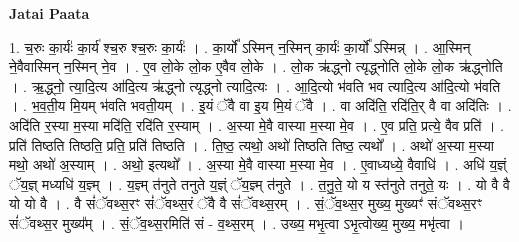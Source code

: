 \documentclass[17pt]{extarticle}
\begin{document}
\textbf{Jatai Paata} \newline

1. च॒रुः का॒र्यः॑ का॒र्य॑ श्च॒रु श्च॒रुः का॒र्यः॑ । . का॒र्यो᳚ ऽस्मिन् न॒स्मिन् का॒र्यः॑ का॒र्यो᳚ ऽस्मिन्न् । . आ॒स्मिन् ने॒वैवास्मिन् न॒स्मिन् ने॒व । . ए॒व लो॒के लो॒क ए॒वैव लो॒के । . लो॒क ऋ॑द्ध्नो त्यृद्ध्नोति लो॒के लो॒क ऋ॑द्ध्नोति । . ऋ॒द्ध्नो॒ त्या॒दि॒त्य आ॑दि॒त्य ऋ॑द्ध्नो त्यृद्ध्नो त्यादि॒त्यः । . आ॒दि॒त्यो भ॑वति भव त्यादि॒त्य आ॑दि॒त्यो भ॑वति । . भ॒व॒ती॒य मि॒यम् भ॑वति भवती॒यम् । . इ॒यं ॅवै वा इ॒य मि॒यं ॅवै । . वा अदि॑ति॒ रदि॑ति॒र् वै वा अदि॑तिः । . अदि॑ति र॒स्या म॒स्या मदि॑ति॒ रदि॑ति र॒स्याम् । . अ॒स्या मे॒वै वास्या म॒स्या मे॒व । . ए॒व प्रति॒ प्रत्ये॒ वैव प्रति॑ । . प्रति॑ तिष्ठति तिष्ठति॒ प्रति॒ प्रति॑ तिष्ठति । . ति॒ष्ठ॒ त्यथो॒ अथो॑ तिष्ठति तिष्ठ॒ त्यथो᳚ । . अथो॑ अ॒स्या म॒स्या मथो॒ अथो॑ अ॒स्याम् । . अथो॒ इत्यथो᳚ । . अ॒स्या मे॒वै वास्या म॒स्या मे॒व । . ए॒वाध्यध्ये॒ वैवाधि॑ । . अधि॑ य॒ज्ञ्ं ॅय॒ज्ञ् मध्यधि॑ य॒ज्ञ्म् । . य॒ज्ञ्म् त॑नुते तनुते य॒ज्ञ्ं ॅय॒ज्ञ्म् त॑नुते । . त॒नु॒ते॒ यो य स्त॑नुते तनुते॒ यः । . यो वै वै यो यो वै । . वै सं॑ॅवथ्स॒रꣳ सं॑ॅवथ्स॒रं ॅवै वै सं॑ॅवथ्स॒रम् । . सं॒ॅव॒थ्स॒र मुख्य॒ मुख्यꣳ॑ संॅवथ्स॒रꣳ सं॑ॅवथ्स॒र मुख्य᳚म् । . सं॒ॅव॒थ्स॒रमिति॑ सं - व॒थ्स॒रम् । . उख्य॒ मभृ॒त्वा ऽभृ॒त्वोख्य॒ मुख्य॒ मभृ॑त्वा । \newline
\end{document}

